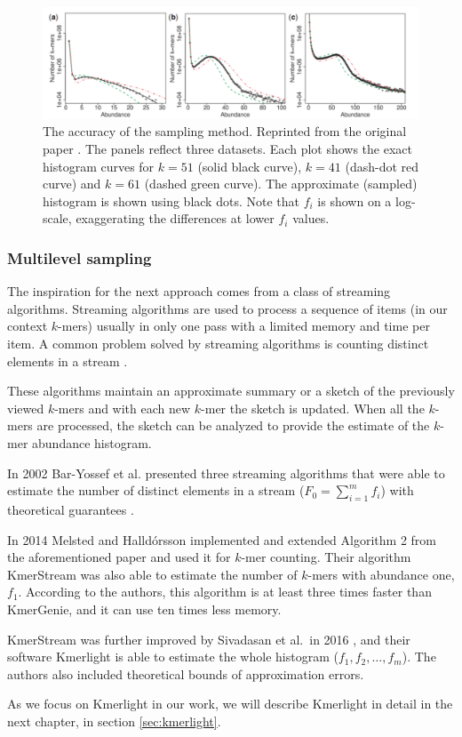 \begin{figure}
\centerline{\includegraphics[width=1.1\textwidth]{images/kmergenie-sampling-accuracy.pdf}}
\caption[Accuracy of KmerGenie sampling]{The accuracy of the sampling method. 
Reprinted from the original paper \cite{Chikhi2013}. 
The panels reflect three datasets. Each plot shows the exact
histogram curves for $k=51$ (solid black curve), $k=41$ (dash-dot red curve) 
and $k=61$ (dashed green curve). The approximate (sampled) histogram is
shown using black dots. Note that $f_i$ is shown on a log-scale, 
exaggerating the differences at lower $f_i$ values.}
\label{img:kmergenie-sampling-accuracy}
\end{figure}

\subsubsection{Multilevel sampling}
The inspiration for the next approach comes from a class of streaming algorithms.
Streaming algorithms are used to process a sequence of items (in our context $k$-mers) usually 
in only one pass with a limited memory and time per item. A common problem solved by
streaming algorithms is counting distinct elements in a stream \cite{WikiStreamingAlg}.

These algorithms maintain an approximate summary or a sketch of the previously viewed
$k$-mers and with each new $k$-mer the sketch is updated. When all the $k$-mers are processed,
the sketch can be analyzed to provide the estimate of the $k$-mer abundance histogram.

\medskip

In 2002 Bar-Yossef et al. presented three streaming algorithms that were
able to estimate the number of distinct elements in a stream ($F_0 = \sum_{i=1}^{m} f_i$)
with theoretical guarantees \cite{Bar-Yossef2002}. 

In 2014 Melsted and Halldórsson \cite{Melsted2014} implemented and extended Algorithm 2 
from the aforementioned paper \cite{Bar-Yossef2002} and used it for $k$-mer counting. Their
algorithm KmerStream was also able to estimate the number of $k$-mers with abundance one, 
$f_1$. According to the authors, this algorithm is at least three times faster than KmerGenie, 
and it can use ten times less memory.

KmerStream was further improved by Sivadasan et al.\ in 2016 \cite{Sivadasan2016},
and their software Kmerlight is able to estimate the whole histogram ($f_1, f_2, \dots , f_m$).
The authors also included theoretical bounds of approximation errors.

As we focus on Kmerlight in our work, we will describe Kmerlight in detail 
in the next chapter, in section \ref{sec:kmerlight}.
